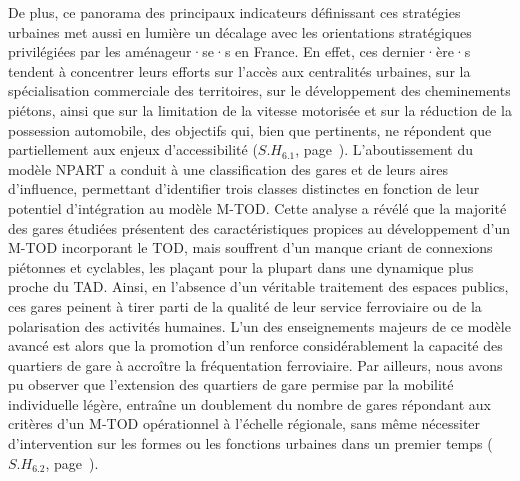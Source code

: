 \begin{refsegment}
De plus, ce panorama des principaux indicateurs définissant ces stratégies urbaines met aussi en lumière un décalage avec les orientations stratégiques privilégiées par les aménageur·se·s en France. En effet, ces dernier·ère·s tendent à concentrer leurs efforts sur l’accès aux centralités urbaines, sur la spécialisation commerciale des territoires, sur le développement des cheminements piétons, ainsi que sur la limitation de la vitesse motorisée et sur la réduction de la possession automobile, des objectifs qui, bien que pertinents, ne répondent que partiellement aux enjeux d’accessibilité (\hyperref[sous-hypothese-6.1]{\(S.H_{6.1}\)}, page~\pageref{sous-hypothese-6.1}). L’aboutissement du modèle \acrshort{NPART} a conduit à une classification des gares et de leurs aires d’influence, permettant d’identifier trois classes distinctes en fonction de leur potentiel d’intégration au modèle \acrshort{M-TOD}. Cette analyse a révélé que la majorité des gares étudiées présentent des caractéristiques propices au développement d’un \acrshort{M-TOD} incorporant le \acrshort{TOD}, mais souffrent d’un manque criant de connexions piétonnes et cyclables, les plaçant pour la plupart dans une dynamique plus proche du \acrfull{TAD}. Ainsi, en l’absence d’un véritable traitement des espaces publics, ces gares peinent à tirer parti de la qualité de leur service ferroviaire ou de la polarisation des activités humaines. L’un des enseignements majeurs de ce modèle avancé est alors que la promotion d’un  renforce considérablement la capacité des quartiers de gare à accroître la fréquentation ferroviaire. Par ailleurs, nous avons pu observer que l'extension des quartiers de gare permise par la mobilité individuelle légère, entraîne un doublement du nombre de gares répondant aux critères d'un \acrshort{M-TOD} opérationnel à l'échelle régionale, sans même nécessiter d'intervention sur les formes ou les fonctions urbaines dans un premier temps (\hyperref[sous-hypothese-6.2]{\(S.H_{6.2}\)}, page~\pageref{sous-hypothese-6.2}).%


\end{refsegment}
